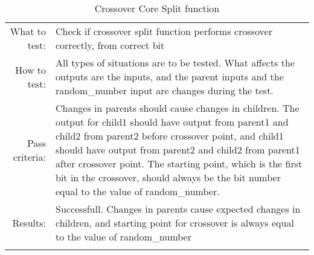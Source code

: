 \begin{table}[H]
  \begin{tabular}{r | p{8cm}}
    \noalign{\smallskip}\hline\noalign{\smallskip}
    
    What to test:  & Check if crossover split function performs crossover correctly, from correct bit \\

    \noalign{\smallskip}\hline\noalign{\smallskip}

    How to test:   &    All types of situations are to be tested. 
                        What affects the outputs are the inputs, and the parent inputs            
                        and the random\_number input are changes during the test. 
                        \\
                      
    \noalign{\smallskip}\hline\noalign{\smallskip}

    Pass criteria: &    Changes in parents should cause changes in children. 
                        The output for child1 should have output from parent1 and child2
                        from parent2 before crossover point, and child1 should have
                        output from parent2 and child2 from parent1 after crossover
                        point. 
                        The starting point, which is the first bit in the crossover,
                        should always be the bit number equal to the value of
                        random\_number.
                        \\
    \noalign{\smallskip}\hline\noalign{\smallskip}
    
    Results: &      Successfull. 
                    Changes in parents cause expected changes in children, and starting 
                    point for crossover is always equal to the value of random\_number
                    \\
   \noalign{\smallskip}\hline\noalign{\smallskip}
  
  
  
  \end{tabular}
  \caption{Crossover Core Split function}
  \label{testing:components:genetic_pipeline:crossover_core_split}
\end{table}
